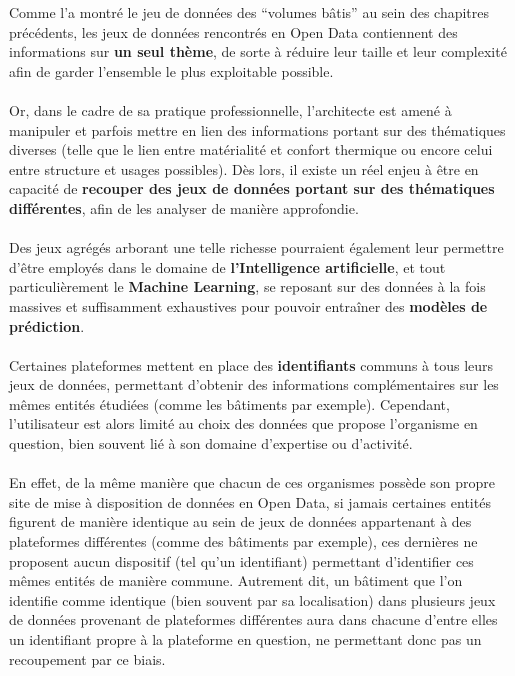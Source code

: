 \documentclass[
  11pt,
  french,
]{article}
\begin{document}
Comme l'a montré le jeu de données des ``volumes bâtis'' au sein des
chapitres précédents, les jeux de données rencontrés en Open Data
contiennent des informations sur \textbf{un seul thème}, de sorte à
réduire leur taille et leur complexité afin de garder l'ensemble le plus
exploitable possible.\\
~\\
Or, dans le cadre de sa pratique professionnelle, l'architecte est amené
à manipuler et parfois mettre en lien des informations portant sur des
thématiques diverses (telle que le lien entre matérialité et confort
thermique ou encore celui entre structure et usages possibles). Dès
lors, il existe un réel enjeu à être en capacité de \textbf{recouper des
jeux de données portant sur des thématiques différentes}, afin de les
analyser de manière approfondie.\\
~\\
Des jeux agrégés arborant une telle richesse pourraient également leur
permettre d'être employés dans le domaine de \textbf{l'Intelligence
artificielle}, et tout particulièrement le \textbf{Machine Learning}, se
reposant sur des données à la fois massives et suffisamment exhaustives
pour pouvoir entraîner des \textbf{modèles de prédiction}.\\
~\\
Certaines plateformes mettent en place des \textbf{identifiants} communs
à tous leurs jeux de données, permettant d'obtenir des informations
complémentaires sur les mêmes entités étudiées (comme les bâtiments par
exemple). Cependant, l'utilisateur est alors limité au choix des données
que propose l'organisme en question, bien souvent lié à son domaine
d'expertise ou d'activité.\\
~\\
En effet, de la même manière que chacun de ces organismes possède son
propre site de mise à disposition de données en Open Data, si jamais
certaines entités figurent de manière identique au sein de jeux de
données appartenant à des plateformes différentes (comme des bâtiments
par exemple), ces dernières ne proposent aucun dispositif (tel qu'un
identifiant) permettant d'identifier ces mêmes entités de manière
commune. Autrement dit, un bâtiment que l'on identifie comme identique
(bien souvent par sa localisation) dans plusieurs jeux de données
provenant de plateformes différentes aura dans chacune d'entre elles un
identifiant propre à la plateforme en question, ne permettant donc pas
un recoupement par ce biais.\\
~\\
\end{document}
